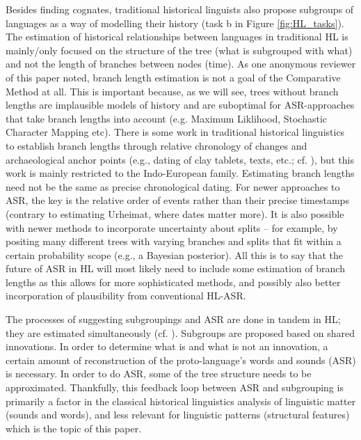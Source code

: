 \documentclass[12pt,letterpaper]{article}
\begin{document}


Besides finding cognates, traditional historical linguists also propose subgroups of languages as a way of modelling their history (task b in Figure \ref{fig:HL_tasks}). The estimation of historical relationships between languages in traditional HL is mainly/only focused on the structure of the tree (what is subgrouped with what) and not the length of branches between nodes (time). As one anonymous reviewer of this paper noted, branch length estimation is not a goal of the Comparative Method at all. This is important because, as we will see, trees without branch lengths are implausible models of history and are suboptimal for ASR-approaches that take branch lengths into account (e.g. Maximum Liklihood, Stochastic Character Mapping etc). There is some work in traditional historical linguistics to establish branch lengths through relative chronology of changes and archaeological anchor points (e.g., dating of clay tablets, texts, etc.; cf. \citealt{pereltsvaig2015indo_dates}), but this work is mainly restricted to the Indo-European family. Estimating branch lengths need not be the same as precise chronological dating. For newer approaches to ASR, the key is the relative order of events rather than their precise timestamps (contrary to estimating Urheimat, where dates matter more). It is also possible with newer methods to incorporate uncertainty about splits -- for example, by positing many different trees with varying branches and splits that fit within a certain probability scope (e.g., a Bayesian posterior). All this is to say that the future of ASR in HL will most likely need to include some estimation of branch lengths as this allows for more sophisticated methods, and possibly also better incorporation of plausibility from conventional HL-ASR.

The processes of suggesting subgroupings and ASR are done in tandem in HL; they are estimated simultaneously (cf. \citealt[7]{protooceanicvol1}). Subgroups are proposed based on shared innovations. In order to determine what is and what is not an innovation, a certain amount of reconstruction of the proto-language's words and sounds (ASR) is necessary. In order to do ASR, some of the tree structure needs to be approximated. Thankfully, this feedback loop between ASR and subgrouping is primarily a factor in the classical historical linguistics analysis of linguistic matter (sounds and words), and less relevant for linguistic patterns (structural features) which is the topic of this paper.
\end{document}
